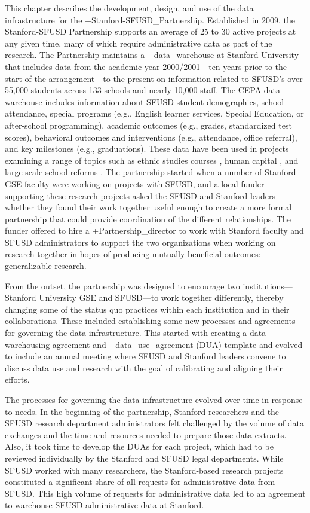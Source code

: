 \documentclass[
]{book}
\begin{document}
This chapter describes the development, design, and use of the data infrastructure for the +Stanford-SFUSD\_Partnership\textbar. Established in 2009, the Stanford-SFUSD Partnership supports an average of 25 to 30 active projects at any given time, many of which require administrative data as part of the research. The Partnership maintains a +data\_warehouse\textbar{} at Stanford University that includes data from the academic year 2000/2001---ten years prior to the start of the arrangement---to the present on information related to SFUSD's over 55,000 students across 133 schools and nearly 10,000 staff. The CEPA data warehouse includes information about SFUSD student demographics, school attendance, special programs (e.g., English learner services, Special Education, or after-school programming), academic outcomes (e.g., grades, standardized test scores), behavioral outcomes and interventions (e.g., attendance, office referral), and key milestones (e.g., graduations). These data have been used in projects examining a range of topics such as ethnic studies courses \citep{dee2017}, human capital \citep{dizon-ross2019}, and large-scale school reforms \citep{sun2017}. The partnership started when a number of Stanford GSE faculty were working on projects with SFUSD, and a local funder supporting these research projects asked the SFUSD and Stanford leaders whether they found their work together useful enough to create a more formal partnership that could provide coordination of the different relationships. The funder offered to hire a +Partnership\_director\textbar{} to work with Stanford faculty and SFUSD administrators to support the two organizations when working on research together in hopes of producing mutually beneficial outcomes: generalizable research.

From the outset, the partnership was designed to encourage two institutions---Stanford University GSE and SFUSD---to work together differently, thereby changing some of the status quo practices within each institution and in their collaborations. These included establishing some new processes and agreements for governing the data infrastructure. This started with creating a data warehousing agreement and +data\_use\_agreement\textbar{} (DUA) template and evolved to include an annual meeting where SFUSD and Stanford leaders convene to discuss data use and research with the goal of calibrating and aligning their efforts.

The processes for governing the data infrastructure evolved over time in response to needs. In the beginning of the partnership, Stanford researchers and the SFUSD research department administrators felt challenged by the volume of data exchanges and the time and resources needed to prepare those data extracts. Also, it took time to develop the DUAs for each project, which had to be reviewed individually by the Stanford and SFUSD legal departments. While SFUSD worked with many researchers, the Stanford-based research projects constituted a significant share of all requests for administrative data from SFUSD. This high volume of requests for administrative data led to an agreement to warehouse SFUSD administrative data at Stanford.
\end{document}
